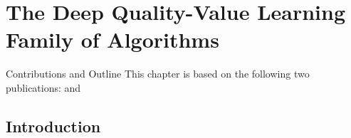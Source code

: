 
\chapter{The Deep Quality-Value Learning Family of Algorithms} %
\label{ch:dqv_family_of_algorithms} %


\begin{remark}{Contributions and Outline}
	This chapter is based on the following two publications: \citet{sabatelli2018deepqv} and \citet{sabatelli2020deep}
	\vspace{5mm}
\end{remark}

\section{Introduction}               
